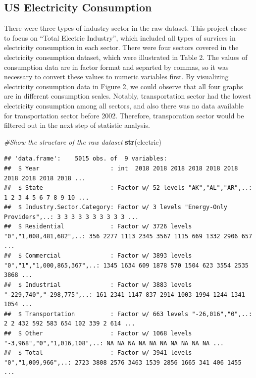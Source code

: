 \documentclass[12pt,]{article}
\newenvironment{Shaded}{\begin{snugshade}}{\end{snugshade}}
\newcommand{\KeywordTok}[1]{\textcolor[rgb]{0.13,0.29,0.53}{\textbf{#1}}}
\newcommand{\CommentTok}[1]{\textcolor[rgb]{0.56,0.35,0.01}{\textit{#1}}}
\newcommand{\NormalTok}[1]{#1}
\begin{document}
\newpage

\subsection{US Electricity
Consumption}\label{us-electricity-consumption}

There were three types of industry sector in the raw dataset. This
project chose to focus on ``Total Electric Industry'', which included
all types of survices in electricity consumption in each sector. There
were four sectors covered in the electricity consumption dataset, which
were illustrated in Table 2. The values of consumption data are in
factor format and separted by commas, so it was necessary to convert
these values to numeric variables first. By visualizing electricity
consumption data in Figure 2, we could observe that all four graphs are
in different consumption scales. Notably, transportation sector had the
lowest electricity consumption among all sectors, and also there was no
data available for transportation sector before 2002. Therefore,
transporation sector would be filtered out in the next step of statistic
analysis.

\begin{Shaded}
\begin{Highlighting}[]
\CommentTok{#Show the structure of the raw dataset}
\KeywordTok{str}\NormalTok{(electric)}
\end{Highlighting}
\end{Shaded}

\begin{verbatim}
## 'data.frame':    5015 obs. of  9 variables:
##  $ Year                    : int  2018 2018 2018 2018 2018 2018 2018 2018 2018 2018 ...
##  $ State                   : Factor w/ 52 levels "AK","AL","AR",..: 1 2 3 4 5 6 7 8 9 10 ...
##  $ Industry.Sector.Category: Factor w/ 3 levels "Energy-Only Providers",..: 3 3 3 3 3 3 3 3 3 3 ...
##  $ Residential             : Factor w/ 3726 levels "0","1,008,481,682",..: 356 2277 1113 2345 3567 1115 669 1332 2906 657 ...
##  $ Commercial              : Factor w/ 3893 levels "0","1","1,000,865,367",..: 1345 1634 609 1878 570 1504 623 3554 2535 3868 ...
##  $ Industrial              : Factor w/ 3883 levels "-229,740","-298,775",..: 161 2341 1147 837 2914 1003 1994 1244 1341 1054 ...
##  $ Transportation          : Factor w/ 663 levels "-26,016","0",..: 2 2 432 592 583 654 102 339 2 614 ...
##  $ Other                   : Factor w/ 1068 levels "-3,968","0","1,016,108",..: NA NA NA NA NA NA NA NA NA NA ...
##  $ Total                   : Factor w/ 3941 levels "0","1,009,966",..: 2723 3808 2576 3463 1539 2856 1665 341 406 1455 ...
\end{verbatim}
\end{document}
